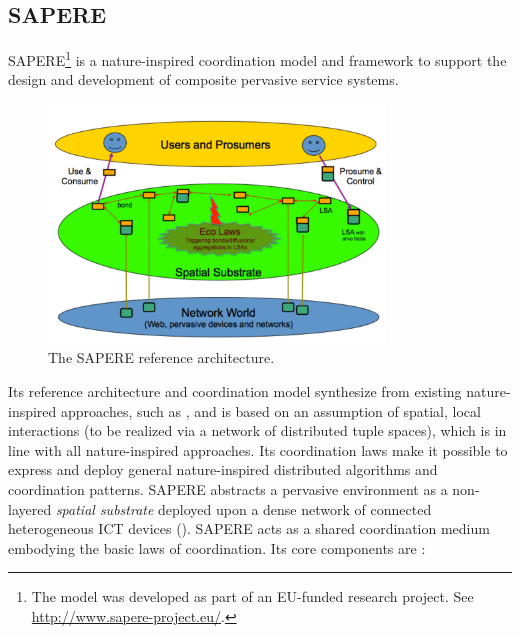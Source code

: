 \documentclass[12pt,a4paper,twoside,openright]{book}
\begin{document}
\subsection{SAPERE}
\label{sapere}
SAPERE\footnote{The model was developed as part of an EU-funded research project. See \url{http://www.sapere-project.eu/}.} \cite{sapere-procedia7} is a nature-inspired coordination model and framework to support the design and development of composite pervasive service systems.
\begin{figure}
\centering
\includegraphics[width=0.8\textwidth]{img/architecture_2.pdf}
\caption[SAPERE reference architecture]{The SAPERE reference architecture.}
\label{img:sapere-architecture}
\end{figure}
%
Its reference architecture and coordination model synthesize from existing nature-inspired approaches, such as \cite{biochemicalTupleSpaces, frameworkSelfOrg, VCMZ-TAAS2011, wordNet}, and is based on an assumption of spatial, local interactions (to be realized via a network of distributed tuple spaces), which is in line with all nature-inspired approaches.
%
Its coordination laws make it possible to express and deploy general nature-inspired distributed algorithms and coordination patterns.
%
SAPERE abstracts a pervasive environment as a non-layered \emph{spatial substrate} deployed upon a dense network of connected heterogeneous ICT devices ().
%
SAPERE acts as a shared coordination medium embodying the basic laws of coordination.
%
Its core components are \cite{sapereecolaws-sac2012}:
\end{document}
